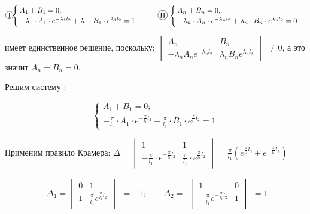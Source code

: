 \begin{equation*}
  \circled{I}\!\!
  \begin{split}
    \begin{cases}
      A_{1} + B_{1} = 0;\\
      -\lambda_{1} \cdot A_{1} \cdot e^{-\lambda_{1}l_{2}} + \lambda_{1} \cdot B_{1} \cdot e^{\lambda_{1}l_{2}} = 1
    \end{cases}
  \end{split}
\quad\quad\circled{II}\,\,
  \begin{split}
    \begin{cases}
      A_{n} + B_{n} = 0;\\
      -\lambda_{n} \cdot A_{n} \cdot e^{-\lambda_{n}l_{2}} + \lambda_{n} \cdot B_{n} \cdot e^{\lambda_{n}l_{2}} = 0
    \end{cases}
  \end{split}
\end{equation*}

 имеет единственное решение, поскольку:
$\begin{vmatrix}
A_{n}& B_{n}\\
-\lambda_{n}A_{n}e^{-\lambda_{n}l_{2}}& \lambda_{n}B_{n}e^{\lambda_{n}l_{2}}
\end{vmatrix}$
$\neq 0$, а это значит $A_{n} = B_{n} = 0$.

Решим систему :

$$
\begin{cases}
  A_{1} + B_{1} = 0;\\
  -\frac{\pi}{l_{1}} \cdot A_{1} \cdot e^{-\frac{\pi}{l_{1}}l_{2}} + \frac{\pi}{l_{1}} \cdot B_{1} \cdot e^{\frac{\pi}{l_{1}}l_{2}} = 1
\end{cases}
$$

Применим правило Крамера: 
$\Delta = 
\begin{vmatrix}
1& 1\\
-\frac{\pi}{l_{1}} \cdot e^{-\frac{\pi}{l_{1}}l_{2}}& \frac{\pi}{l_{1}} \cdot e^{\frac{\pi}{l_{1}}l_{2}}
\end{vmatrix}
= \frac{\pi}{l_{1}}\left( e^{\frac{\pi}{l_{1}}l_{2}} + e^{-\frac{\pi}{l_{1}}l_{2}} \right)$

\begin{equation*}
  \begin{split}
    \Delta_{1} = 
    \begin{vmatrix}
    0& 1\\
    1& \frac{\pi}{l_{1}} e^{\frac{\pi}{l_{1}}l_{2}}
    \end{vmatrix}
  \end{split}
= -1; \quad\quad \Delta_{2} =
  \begin{split}
    \begin{vmatrix}
    1& 0\\
    -\frac{\pi}{l_{1}} e^{-\frac{\pi}{l_{1}}l_{2}}& 1
    \end{vmatrix}
  \end{split}
= 1
\end{equation*}

